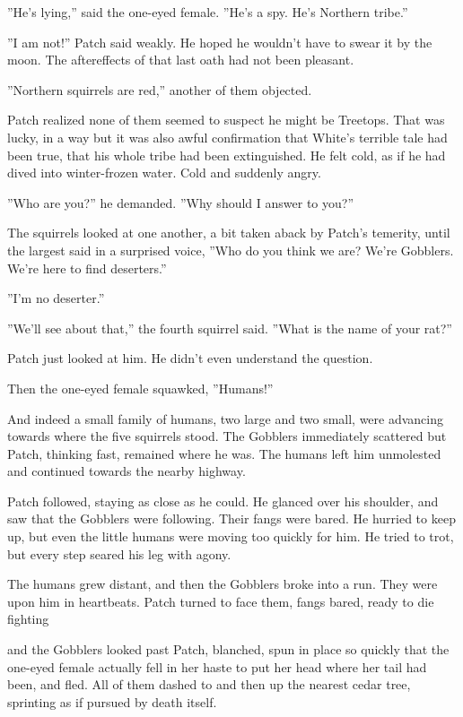 \documentclass[12pt]{book}
\begin{document}
 ''He's lying,'' said the one-eyed female. ''He's a spy. He's Northern tribe.''\par
 ''I am not!'' Patch said weakly. He hoped he wouldn't have to swear it by the moon. The aftereffects of that last oath had not been pleasant. \par
 ''Northern squirrels are red,'' another of them objected.\par
 Patch realized none of them seemed to suspect he might be Treetops. That was lucky, in a way %
 but it was also awful confirmation that White's terrible tale had been true, that his whole tribe had been extinguished. He felt cold, as if he had dived into winter-frozen water. Cold and suddenly angry.\par
 ''Who are you?'' he demanded. ''Why should I answer to you?''\par
 The squirrels looked at one another, a bit taken aback by Patch's temerity, until the largest said in a surprised voice, ''Who do you think we are? We're Gobblers. We're here to find deserters.''\par
 ''I'm no deserter.''\par
 ''We'll see about that,'' the fourth squirrel said. ''What is the name of your rat?''\par
 Patch just looked at him. He didn't even understand the question.\par
 Then the one-eyed female squawked, ''Humans!''\par
 And indeed a small family of humans, two large and two small, were advancing towards where the five squirrels stood. The Gobblers immediately scattered %
 but Patch, thinking fast, remained where he was. The humans left him unmolested and continued towards the nearby highway.\par
Patch followed, staying as close as he could. He glanced over his shoulder, and saw that the Gobblers were following. Their fangs were bared. He hurried to keep up, but even the little humans were moving too quickly for him. He tried to trot, but every step seared his leg with agony.\par
The humans grew distant, and then the Gobblers broke into a run. They were upon him in heartbeats. Patch turned to face them, fangs bared, ready to die fighting %
\par
 and the Gobblers looked past Patch, blanched, spun in place so quickly that the one-eyed female actually fell in her haste to put her head where her tail had been, and fled. All of them dashed to and then up the nearest cedar tree, sprinting as if pursued by death itself.\par
\end{document}
